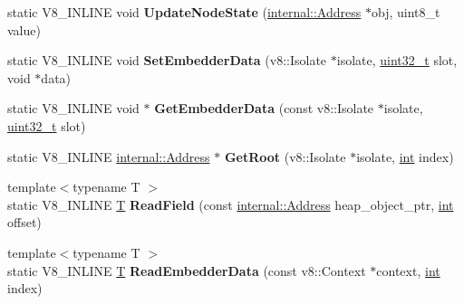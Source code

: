 \begin{DoxyCompactItemize}
static V8\+\_\+\+I\+N\+L\+I\+NE void {\bfseries Update\+Node\+State} (\mbox{\hyperlink{classuintptr__t}{internal\+::\+Address}} $\ast$obj, uint8\+\_\+t value)
\item 
\mbox{\label{classv8_1_1internal_1_1Internals_abe73d79832edf012f30a94ccc4b293d2}} 
static V8\+\_\+\+I\+N\+L\+I\+NE void {\bfseries Set\+Embedder\+Data} (v8\+::\+Isolate $\ast$isolate, \mbox{\hyperlink{classuint32__t}{uint32\+\_\+t}} slot, void $\ast$data)
\item 
\mbox{\label{classv8_1_1internal_1_1Internals_ab53d3d4ef80770cb3e7d10effed86d10}} 
static V8\+\_\+\+I\+N\+L\+I\+NE void $\ast$ {\bfseries Get\+Embedder\+Data} (const v8\+::\+Isolate $\ast$isolate, \mbox{\hyperlink{classuint32__t}{uint32\+\_\+t}} slot)
\item 
\mbox{\label{classv8_1_1internal_1_1Internals_a2bee569fd8bb0a97470679d88e22dc30}} 
static V8\+\_\+\+I\+N\+L\+I\+NE \mbox{\hyperlink{classuintptr__t}{internal\+::\+Address}} $\ast$ {\bfseries Get\+Root} (v8\+::\+Isolate $\ast$isolate, \mbox{\hyperlink{classint}{int}} index)
\item 
\mbox{\label{classv8_1_1internal_1_1Internals_a9a0239f7b97b5057d2a3c7137a3297b3}} 
{\footnotesize template$<$typename T $>$ }\\static V8\+\_\+\+I\+N\+L\+I\+NE \mbox{\hyperlink{classv8_1_1internal_1_1torque_1_1T}{T}} {\bfseries Read\+Field} (const \mbox{\hyperlink{classuintptr__t}{internal\+::\+Address}} heap\+\_\+object\+\_\+ptr, \mbox{\hyperlink{classint}{int}} offset)
\item 
\mbox{\label{classv8_1_1internal_1_1Internals_a98cf4d5b60b963cc544cdd3aeda52335}} 
{\footnotesize template$<$typename T $>$ }\\static V8\+\_\+\+I\+N\+L\+I\+NE \mbox{\hyperlink{classv8_1_1internal_1_1torque_1_1T}{T}} {\bfseries Read\+Embedder\+Data} (const v8\+::\+Context $\ast$context, \mbox{\hyperlink{classint}{int}} index)
\end{DoxyCompactItemize}
